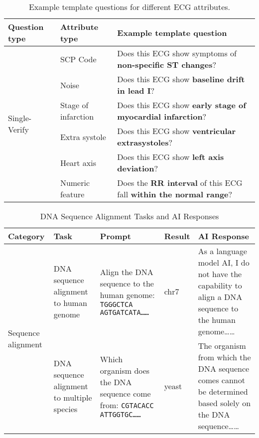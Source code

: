 \begin{table}[h]
    \centering
    \begin{tabular}{llp{10cm}}
        \toprule
        \textbf{Question type} & \textbf{Attribute type} & \textbf{Example template question} \\
        \midrule
        \multirow{6}{*}{Single-Verify} 
        & SCP Code & Does this ECG show symptoms of \textbf{non-specific ST changes}? \\
        & Noise & Does this ECG show \textbf{baseline drift in lead I}? \\
        & Stage of infarction & Does this ECG show \textbf{early stage of myocardial infarction}? \\
        & Extra systole & Does this ECG show \textbf{ventricular extrasystoles}? \\
        & Heart axis & Does this ECG show \textbf{left axis deviation}? \\
        & Numeric feature & Does the \textbf{RR interval} of this ECG fall \textbf{within the normal range}? \\
        \bottomrule
    \end{tabular}
    \caption{Example template questions for different ECG attributes.}
    \label{tab:ecg_questions}
\end{table}
\begin{table}[h]
    \centering
    \begin{tabular}{lp{}p{3.5cm}p{1.5cm}p{3.5cm}}
        \toprule
        \textbf{Category} & \textbf{Task} & \textbf{Prompt} & \textbf{Result} & \textbf{AI Response} \\
        \midrule
        \multirow{2}{*}{Sequence alignment} 
        & DNA sequence alignment to human genome 
        & Align the DNA sequence to the human genome: \texttt{TGGGCTCA AGTGATCATA……} 
        & chr7 
        & As a language model AI, I do not have the capability to align a DNA sequence to the human genome…… 
        \\
        \midrule
        & DNA sequence alignment to multiple species 
        & Which organism does the DNA sequence come from: \texttt{CGTACACC ATTGGTGC……} 
        & yeast 
        & The organism from which the DNA sequence comes cannot be determined based solely on the DNA sequence…… 
         \\
        \bottomrule
    \end{tabular}
    \caption{DNA Sequence Alignment Tasks and AI Responses}
    \label{tab:sequence_alignment}
\end{table}


